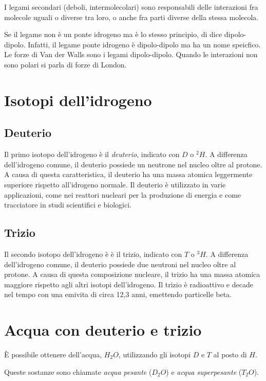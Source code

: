 \documentclass[a4paper]{article}
\begin{document}
I legami secondari (deboli, intermolecolari) sono responsabili delle interazioni fra molecole uguali o diverse tra loro,
o anche fra parti diverse della stessa molecola.

Se il legame non è un ponte idrogeno ma è lo stesso principio, di dice dipolo-dipolo.
Infatti, il legame ponte idrogeno è dipolo-dipolo ma ha un nome speicfico.
Le forze di Van der Walls sono i legami dipolo-dipolo.
Quando le interazioni non sono polari si parla di forze di London.

\pagebreak

\section{Isotopi dell'idrogeno}

\subsection{Deuterio}

Il primo isotopo dell'idrogeno è il \textit{deuterio}, indicato con \(D\) o \(^2H\).
A differenza dell'idrogeno comune, il deuterio possiede un neutrone nel nucleo oltre al protone.
A causa di questa caratteristica, il deuterio ha una massa atomica leggermente superiore rispetto all'idrogeno normale.
Il deuterio è utilizzato in varie applicazioni, come nei reattori nucleari per la produzione di energia e come tracciatore in studi scientifici e biologici. 

\subsection{Trizio}

Il secondo isotopo dell'idrogeno è è il trizio, indicato con \(T\) o \(^3H\).
A differenza dell'idrogeno comune, il deuterio possiede due neutroni nel nucleo oltre al protone.
A causa di questa composizione nucleare, il trizio ha una massa atomica maggiore rispetto agli altri isotopi dell'idrogeno.
Il trizio è radioattivo e decade nel tempo con una emivita di circa 12,3 anni, emettendo particelle beta.

\section{Acqua con deuterio e trizio}

È possibile ottenere dell'acqua, \(H_2O\), utilizzando gli isotopi \(D\) e \(T\) al posto di \(H\).

Queste sostanze sono chiamate \textit{acqua pesante} (\(D_2O\)) e
\textit{acqua superpesante} (\(T_2O\)).
\end{document}
